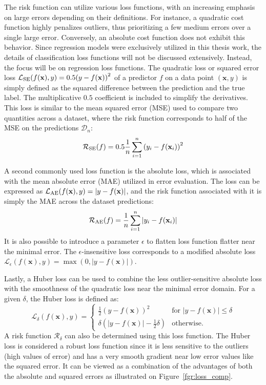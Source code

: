 \documentclass[main]{subfiles}
\begin{document}
The risk function can utilize various loss functions, with an increasing emphasis on large errors depending on their definitions. For instance, a quadratic cost function highly penalizes outliers, thus prioritizing a few medium errors over a single large error. Conversely, an absolute cost function does not exhibit this behavior. Since regression models were exclusively utilized in this thesis work, the details of classification loss functions will not be discussed extensively. Instead, the focus will be on regression loss functions. The quadratic loss or squared error loss $\mathcal{L}_{\text{SE}}(f(\mathbf{x}),y)=0.5{\left(y-f(\mathbf{x})\right)}^2$ of a predictor $f$ on a data point $(\mathbf{x},y)$ is simply defined as the squared difference between the prediction and the true label. The multiplicative $0.5$ coefficient is included to simplify the derivatives. This loss is similar to the mean squared error (MSE) used to compare two quantities across a dataset, where the risk function corresponds to half of the MSE on the predictions $\mathcal{D}_n$:
\begin{equation}
  \mathcal{R}_{\text{SE}}(f) = 0.5\frac{1}{n}\sum_{i=1}^n {\left(y_i-f(\mathbf{x}_i)\right)}^2
\end{equation}

A second commonly used loss function is the absolute loss, which is associated with the mean absolute error (MAE) utilized in error evaluation. The loss can be expressed as $\mathcal{L}_{\text{AE}}(f(\mathbf{x}),y)=\left|y-f(\mathbf{x})\right|$, and the risk function associated with it is simply the MAE across the dataset predictions:
\begin{equation}
  \mathcal{R}_{\text{AE}}(f) = \frac{1}{n}\sum_{i=1}^n \left|y_i-f(\mathbf{x}_i)\right|
\end{equation}
It is also possible to introduce a parameter $\epsilon$ to flatten loss function flatter near the minimal error. The $\epsilon$-insensitive loss corresponds to a modified absolute loss $\mathcal{L}_{\epsilon}(f(\mathbf{x}),y)=\max\left(0,\left|y-f(\mathbf{x})\right|\right)$.

Lastly, a Huber loss can be used to combine the less outlier-sensitive absolute loss with the smoothness of the quadratic loss near the minimal error domain. For a given $\delta$, the Huber loss is defined as:
\begin{equation}
  \mathcal{L}_{\delta}(f(\mathbf{x}),y) = \left\{
    \begin{array}{ll}
        \tfrac{1}{2}{\left(y-f(\mathbf{x})\right)}^2 & \mbox{for } \left|y-f(\mathbf{x})\right| \leq \delta \\
        \delta\left(\left|y-f(\mathbf{x})\right| - \tfrac{1}{2}\delta\right) & \mbox{otherwise.}
    \end{array}
  \right.
\end{equation}
A risk function $\mathcal{R}_{\delta}$ can also be determined using this loss function. The Huber loss is considered a robust loss function since it is less sensitive to the outliers (high values of error) and has a very smooth gradient near low error values like the squared error. It can be viewed as a combination of the advantages of both the absolute and squared errors as illustrated on Figure~\ref{fgr:loss_comp}.
\end{document}
